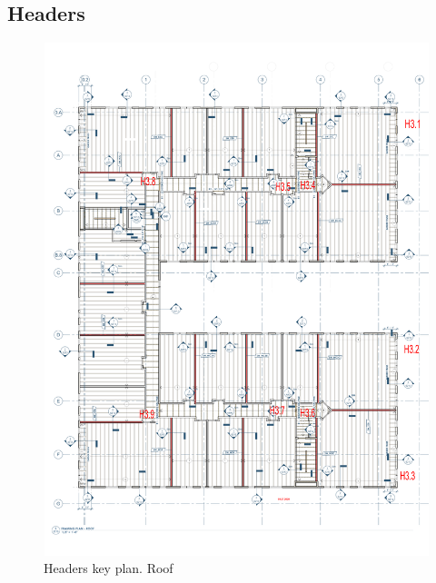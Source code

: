 \subsection{Headers}

\begin{figure}
  \begin{center}
  \includegraphics[width=120mm]{figures/headers/headers_key_plan_roof}
  \end{center}
  \caption{Headers key plan. Roof}\label{fg_headers_key_plan_roof}
\end{figure}

